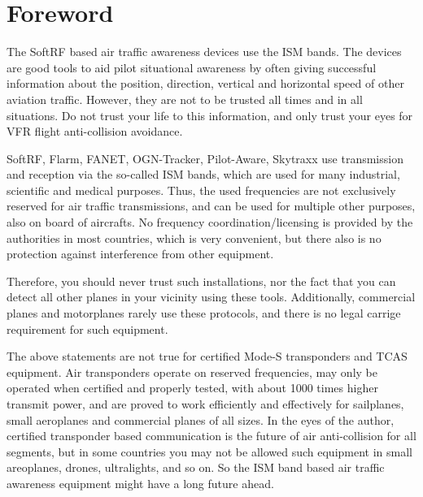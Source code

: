\documentclass[10pt,a4paper]{article}
\begin{document}
\section{Foreword}
The SoftRF based air traffic awareness devices use the ISM bands. The devices are good tools to aid pilot situational awareness by often giving successful information about the position, direction, vertical and horizontal speed of other aviation traffic. However, they are not to be trusted all times and in all situations. Do not trust your life to this information, and only trust your eyes for VFR flight anti-collision avoidance.

SoftRF, Flarm, FANET, OGN-Tracker, Pilot-Aware, Skytraxx use transmission and reception via the so-called ISM bands, which are used for many industrial, scientific and medical purposes. Thus, the used frequencies are not exclusively reserved for air traffic transmissions, and can be used for multiple other purposes, also on board of aircrafts. No frequency coordination/licensing is provided by the authorities in most countries, which is very convenient, but there also is no protection against interference from other equipment.

\begin{center}
\end{center}

Therefore, you should never trust such installations, nor the fact that you can detect all other planes in your vicinity using these tools. Additionally, commercial planes and motorplanes rarely use these protocols, and there is no legal carrige requirement for such equipment.

The above statements are not true for certified Mode-S transponders and TCAS equipment. Air transponders operate on reserved frequencies, may only be operated when certified and properly tested, with about 1000 times higher transmit power, and are proved to work efficiently and effectively for sailplanes, small aeroplanes and commercial planes of all sizes. In the eyes of the author, certified transponder based communication is the future of air anti-collision for all segments, but in some countries you may not be allowed such equipment in small areoplanes, drones, ultralights, and so on. So the ISM band based air traffic awareness equipment might have a long future ahead.
\end{document}

